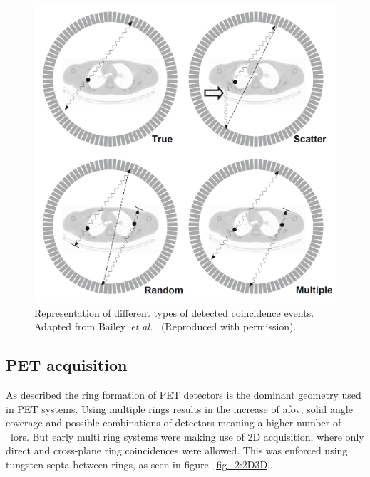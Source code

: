 %
\begin{figure} [ht!]
\centering
\includegraphics[scale=0.22,angle=0]{2_Theory_Methods/figures/Bailey_Scatter_Random_events.png}
\caption[Representation of different types of detected coincidence events.]{Representation of different types of detected coincidence events. Adapted from Bailey~\textit{et al.}~\cite{Bailey2005} (Reproduced with permission).} 
\label{fig_2:EventsIlustration}
\end{figure} 
%
%
\subsection{PET acquisition}
As described the ring formation of PET detectors is the dominant geometry used in PET systems. Using multiple rings results in the increase of \gls{afov}, solid angle coverage and possible combinations of detectors meaning a higher number of ~\glspl{lor}. But early multi ring systems were making use of 2D acquisition, where only direct and cross-plane ring coincidences were allowed. This was enforced using tungsten septa between rings, as seen in figure~\ref{fig_2:2D3D}. %

